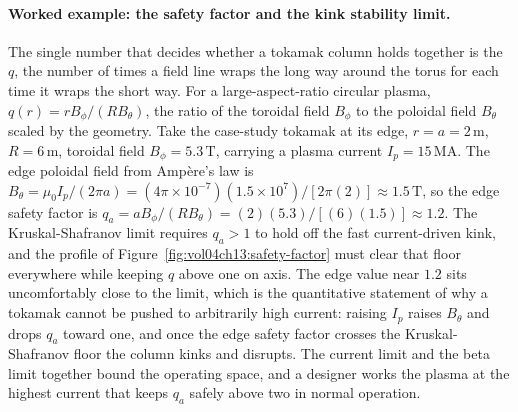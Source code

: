 \paragraph{Worked example: the safety factor and the kink stability limit.}
The single number that decides whether a tokamak column holds together is the
 $q$, the number of times a field line wraps the long way
around the torus for each time it wraps the short way. For a large-aspect-ratio
circular plasma, $q(r) = r B_\phi/(R B_\theta)$, the ratio of the toroidal field
$B_\phi$ to the poloidal field $B_\theta$ scaled by the geometry. Take the
case-study tokamak at its edge, $r = a = 2\,\si{\meter}$, $R = 6\,\si{\meter}$,
toroidal field $B_\phi = 5.3\,\si{\tesla}$, carrying a plasma current $I_p =
15\,\si{\mega\ampere}$. The edge poloidal field from Amp\`ere's law is
$B_\theta = \mu_0 I_p/(2\pi a) = (4\pi\times 10^{-7})(1.5\times 10^{7})/[2\pi
(2)] \approx 1.5\,\si{\tesla}$, so the edge safety factor is $q_a = a B_\phi/
(R B_\theta) = (2)(5.3)/[(6)(1.5)] \approx 1.2$. The Kruskal-Shafranov limit
requires $q_a > 1$ to hold off the fast current-driven kink, and the profile of
Figure~\ref{fig:vol04ch13:safety-factor} must clear that floor everywhere while
keeping $q$ above one on axis. The edge value near $1.2$ sits uncomfortably
close to the limit, which is the quantitative statement of why a tokamak cannot
be pushed to arbitrarily high current: raising $I_p$ raises $B_\theta$ and drops
$q_a$ toward one, and once the edge safety factor crosses the Kruskal-Shafranov
floor the column kinks and disrupts. The current limit and the beta limit
together bound the operating space, and a designer works the plasma at the
highest current that keeps $q_a$ safely above two in normal operation.



